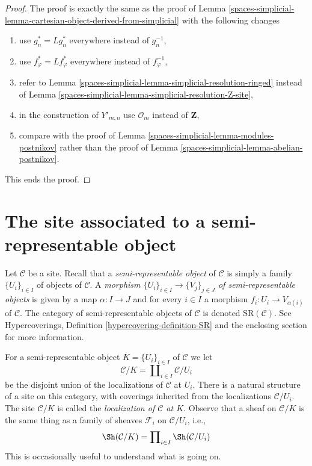 \begin{proof}
The proof is exactly the same as the proof of
Lemma \ref{spaces-simplicial-lemma-cartesian-object-derived-from-simplicial}
with the following changes
\begin{enumerate}
\item use $g_n^* = Lg_n^*$ everywhere instead of $g_n^{-1}$,
\item use $f_\varphi^* = Lf_\varphi^*$ everywhere instead of $f_\varphi^{-1}$,
\item refer to Lemma \ref{spaces-simplicial-lemma-simplicial-resolution-ringed}
instead of Lemma \ref{spaces-simplicial-lemma-simplicial-resolution-Z-site},
\item in the construction of $Y'_{m, n}$ use
$\mathcal{O}_m$ instead of $\mathbf{Z}$,
\item compare with the proof of Lemma \ref{spaces-simplicial-lemma-modules-postnikov}
rather than the proof of Lemma \ref{spaces-simplicial-lemma-abelian-postnikov}.
\end{enumerate}
This ends the proof.
\end{proof}

\section{The site associated to a semi-representable object}
\label{spaces-simplicial-section-semi-representable}
Let $\mathcal{C}$ be a site. Recall that a {\it semi-representable object}
of $\mathcal{C}$ is simply a family $\{U_i\}_{i \in I}$
of objects of $\mathcal{C}$. A
{\it morphism $\{U_i\}_{i \in I} \to \{V_j\}_{j \in J}$ of
semi-representable objects} is given by a map $\alpha : I \to J$
and for every $i \in I$ a morphism $f_i : U_i \to V_{\alpha(i)}$
of $\mathcal{C}$.
The category of semi-representable objects of $\mathcal{C}$
is denoted $\text{SR}(\mathcal{C})$.
See Hypercoverings, Definition \ref{hypercovering-definition-SR}
and the enclosing section for more information.

\medskip\noindent
For a semi-representable object $K = \{U_i\}_{i \in I}$ of $\mathcal{C}$
we let
$$
\mathcal{C}/K = \coprod\nolimits_{i \in I} \mathcal{C}/U_i
$$
be the disjoint union of the localizations of $\mathcal{C}$ at $U_i$.
There is a natural structure of a site on this category, with
coverings inherited from the localizations $\mathcal{C}/U_i$.
The site $\mathcal{C}/K$ is called the
{\it localization of $\mathcal{C}$ at $K$}.
Observe that a sheaf on $\mathcal{C}/K$ is the same thing as
a family of sheaves $\mathcal{F}_i$ on $\mathcal{C}/U_i$, i.e.,
$$
\Sh(\mathcal{C}/K) = \prod\nolimits_{i \in I} \Sh(\mathcal{C}/U_i)
$$
This is occasionally useful to understand what is going on.

